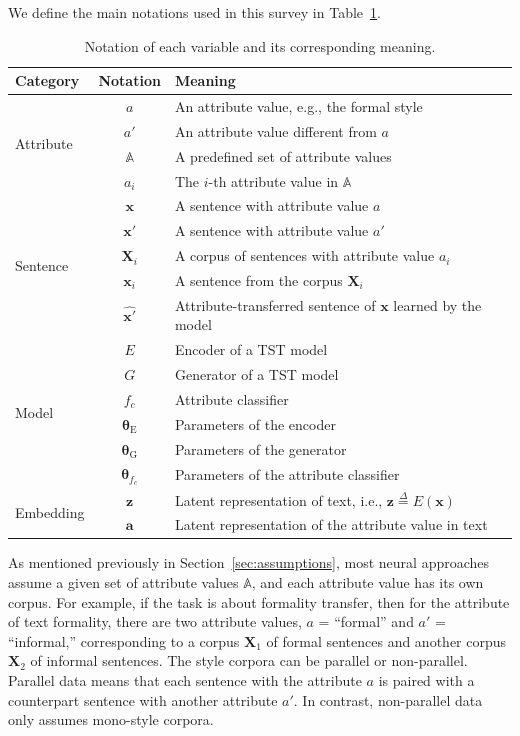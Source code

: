 \label{sec:formulation}
We define the main notations used in this survey in Table~\ref{tab:notation}.
\begin{table}[h]
    \small 
    \caption{Notation of each variable and its corresponding meaning.}
    \label{tab:notation}
    \centering
    \begin{tabular}{lcl}
    \toprule
    \textbf{Category} & \textbf{Notation} & \textbf{Meaning} \\ \midrule
    \multirow{4}{*}{Attribute} & $a$ & An attribute value, e.g., the formal style \\
    & ${a}'$ & An attribute value different from $a$ \\
    & $\mathbb{A}$ & A predefined set of attribute values \\
    & $a_i$ & The $i$-th attribute value in $\mathbb{A}$ \\ 
    \hline
    \multirow{5}{*}{Sentence} & $\bm{x}$ & A sentence with attribute value $a$\\
    & $\bm{x}'$ & A sentence with attribute value ${a}'$ \\
    & $\bm{X}_i$ & A corpus of sentences with attribute value $a_i$ \\
    & $\bm{x}_i$ & A sentence from the corpus $\bm{X}_i$ \\ 
    & $\widehat{\bm{x}'}$ & Attribute-transferred sentence of $\bm{x}$ learned by the model \\
    \hline
    \multirow{6}{*}{Model} & $E$ & Encoder of a TST model \\
    & $G$ & Generator of a TST model \\
    & $f_c$ & Attribute classifier \\
    & $\bm{\theta}_{\mathrm{E}}$ & Parameters of the encoder \\
    & $\bm{\theta}_{\mathrm{G}}$ & Parameters of the generator \\
    & $\bm{\theta}_{f_c}$ & Parameters of the attribute classifier \\
    \hline
    \multirow{2}{*}{Embedding} & $\bm{z}$ & Latent representation of text, i.e., $\bm{z} \overset{\Delta}{=} E(\bm{x})$ \\
    & $\bm{a}$ & Latent representation of the attribute value in text \\
    \bottomrule
    \end{tabular}
\end{table}
As mentioned previously in Section~\ref{sec:assumptions}, most neural approaches assume a given set of attribute values $\mathbb{A}$, and each attribute value has its own corpus. For example, if the task is about formality transfer, then for the attribute of text formality, there are two attribute values, $a$ = ``formal'' and $a'$ = ``informal,'' corresponding to a corpus $\bm{X}_1$ of formal sentences and another corpus $\bm{X}_2$ of informal sentences. The style corpora can be parallel or non-parallel. Parallel data means that each sentence with the attribute $a$ is paired with a counterpart sentence with another attribute ${a}'$. In contrast, non-parallel data only assumes mono-style corpora.

